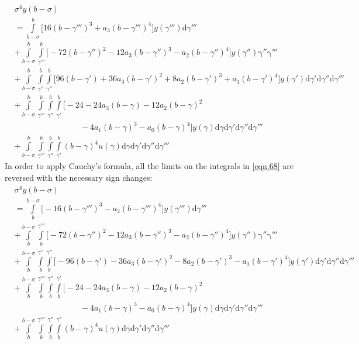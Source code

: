 \documentclass{article}
\begin{document}
\begin{equation}\label{eqn.68}
\begin{split}
	&\sigma^{4}y(b-\sigma)\\
	&=\int\limits_{b-\sigma}^{b}\bigg[16(b-\gamma''')^{3} + a_3(b-\gamma''')^{4}\bigg]y(\gamma''')\mathrm{d}\gamma'''\\
	&+ \int\limits_{b-\sigma}^{b}\int\limits_{\gamma'''}^{b}\bigg[-72(b-\gamma'')^{2} - 12a_3(b-\gamma'')^{3} - a_2(b-\gamma'')^{4}\bigg]y(\gamma'')\mathrm{\gamma''}\mathrm{\gamma'''}\\
	&+\int\limits_{b-\sigma}^{b}\int\limits_{\gamma''}^{b}\int\limits_{\gamma''}^{b}\bigg[96(b-\gamma') + 36a_3(b-\gamma')^{2} + 8a_2(b-\gamma')^{3} + a_1(b-\gamma')^{4}\bigg]y(\gamma')\mathrm{d}\gamma'\mathrm{d}\gamma''\mathrm{d}\gamma'''\\
	&+\int\limits_{b-\sigma}^{b}\int\limits_{\gamma'''}^{b}\int\limits_{\gamma''}^{b}\int\limits_{\gamma'}^{b}\bigg[-24 -24a_3(b-\gamma) - 12a_2(b-\gamma)^{2} 
	\\&\qquad\qquad\qquad\qquad{}- 4a_1(b-\gamma)^{3} - a_0(b-\gamma)^{4}\bigg]y(\gamma)\mathrm{d}\gamma\mathrm{d}\gamma'\mathrm{d}\gamma''\mathrm{d}\gamma'''\\
	&+\int\limits_{b-\sigma}^{b}\int\limits_{\gamma'''}^{b}\int\limits_{\gamma''}^{b}\int\limits_{\gamma'}^{b}(b-\gamma)^{4}u(\gamma)\mathrm{d}\gamma\mathrm{d}\gamma'\mathrm{d}\gamma''\mathrm{d}\gamma'''
\end{split}
\end{equation}
In order to apply Cauchy's formula, all the limits on the integrals in \eqref{eqn.68} are reversed with the necessary sign changes:
\begin{equation}\label{eqn.69}
\begin{split}
	&\sigma^{4}y(b-\sigma)\\
	&=\int\limits_{b}^{b-\sigma}\bigg[-16(b-\gamma''')^{3} - a_3(b-\gamma''')^{4}\bigg]y(\gamma''')\mathrm{d}\gamma'''\\
	&+ \int\limits_{b}^{b-\sigma}\int\limits_{b}^{\gamma'''}\bigg[-72(b-\gamma'')^{2} - 12a_3(b-\gamma'')^{3} - a_2(b-\gamma'')^{4}\bigg]y(\gamma'')\mathrm{\gamma''}\mathrm{\gamma'''}\\
	&+\int\limits_{b}^{b-\sigma}\int\limits_{b}^{\gamma''}\int\limits_{b}^{\gamma''}\bigg[-96(b-\gamma') - 36a_3(b-\gamma')^{2} - 8a_2(b-\gamma')^{3} - a_1(b-\gamma')^{4}\bigg]y(\gamma')\mathrm{d}\gamma'\mathrm{d}\gamma''\mathrm{d}\gamma'''\\
	&+\int\limits_{b}^{b-\sigma}\int\limits_{b}^{\gamma'''}\int\limits_{b}^{\gamma''}\int\limits_{b}^{\gamma'}\bigg[-24 -24a_3(b-\gamma) - 12a_2(b-\gamma)^{2} 
	\\&\qquad\qquad\qquad\qquad{}- 4a_1(b-\gamma)^{3} - a_0(b-\gamma)^{4}\bigg]y(\gamma)\mathrm{d}\gamma\mathrm{d}\gamma'\mathrm{d}\gamma''\mathrm{d}\gamma'''\\
	&+\int\limits_{b}^{b-\sigma}\int\limits_{b}^{\gamma'''}\int\limits_{b}^{\gamma''}\int\limits_{b}^{\gamma'}(b-\gamma)^{4}u(\gamma)\mathrm{d}\gamma\mathrm{d}\gamma'\mathrm{d}\gamma''\mathrm{d}\gamma'''
\end{split}
\end{equation}
\end{document}
